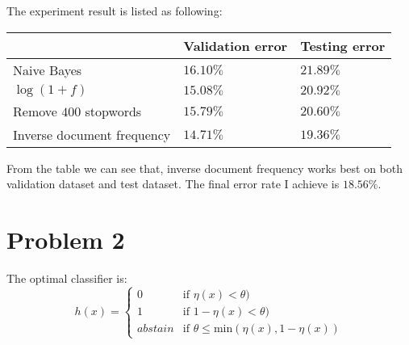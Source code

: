 \documentclass[a4paper,11pt]{article}
\theoremstyle{mytheor}
\begin{document}
The experiment result is listed as following:

\begin{center}
\begin{tabular}{|l|l|l|}
	\hline 
	& Validation error &  Testing error   \\ \hline
	Naive Bayes	& $16.10\%$ & $21.89\%$  \\ \hline 
	$\log(1+f)$ & $15.08\%$ & $20.92\%$  \\ \hline
	Remove $400$ stopwords & $15.79\%$ & $20.60\%$ \\ \hline 
	Inverse document frequency & $14.71\%$ & $19.36\%$ \\ \hline
\end{tabular}
\end{center}

From the table we can see that, inverse document frequency works best on both validation dataset and test dataset. The final error rate I achieve is $18.56\%$.


\section*{Problem 2}
The optimal classifier is:
\begin{equation}
h(x) = \left\{ \begin{array}{ll}
0 & \mbox{if $\eta(x) < \theta$)  }\\
1 & \mbox{if $1 - \eta(x) < \theta$)  }\\
abstain & \mbox{if $\theta \leq \text{min}(\eta(x), 1- \eta(x))$}
\end{array} 
\right.
\end{equation}
\end{document}

